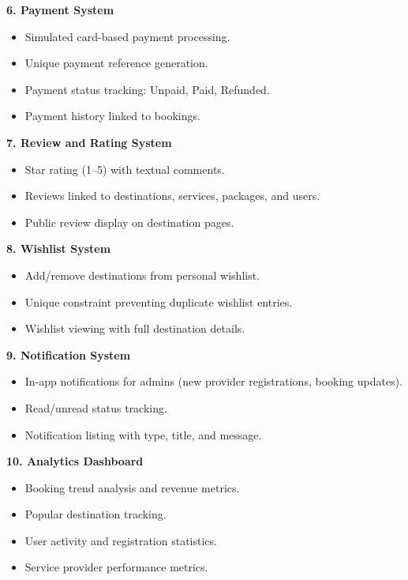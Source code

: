 \textbf{6. Payment System}
\begin{itemize}[leftmargin=2em]
    \item Simulated card-based payment processing.
    \item Unique payment reference generation.
    \item Payment status tracking: Unpaid, Paid, Refunded.
    \item Payment history linked to bookings.
\end{itemize}

\textbf{7. Review and Rating System}
\begin{itemize}[leftmargin=2em]
    \item Star rating (1--5) with textual comments.
    \item Reviews linked to destinations, services, packages, and users.
    \item Public review display on destination pages.
\end{itemize}

\textbf{8. Wishlist System}
\begin{itemize}[leftmargin=2em]
    \item Add/remove destinations from personal wishlist.
    \item Unique constraint preventing duplicate wishlist entries.
    \item Wishlist viewing with full destination details.
\end{itemize}

\textbf{9. Notification System}
\begin{itemize}[leftmargin=2em]
    \item In-app notifications for admins (new provider registrations, booking updates).
    \item Read/unread status tracking.
    \item Notification listing with type, title, and message.
\end{itemize}

\textbf{10. Analytics Dashboard}
\begin{itemize}[leftmargin=2em]
    \item Booking trend analysis and revenue metrics.
    \item Popular destination tracking.
    \item User activity and registration statistics.
    \item Service provider performance metrics.
\end{itemize}

